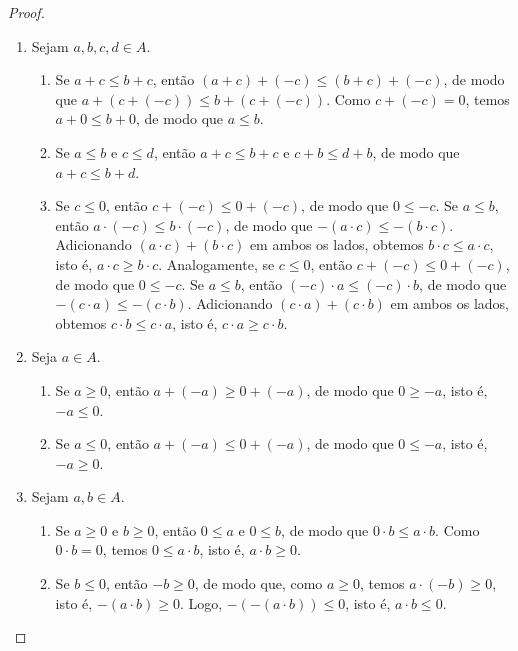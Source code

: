 \begin{proof}
    \leavevmode
        \begin{enumerate}[leftmargin=*, align=left, label=\textbf{(\alph*)}]
            \item Sejam $a, b, c, d \in A$.
                \begin{enumerate}[label=\roman*.]
                    \item Se $a+c \leq b+c$, então $(a+c)+(-c) \leq (b+c)+(-c)$, de modo que $a+(c+(-c)) \leq b+(c+(-c))$. Como $c+(-c) = 0$, temos $a+0 \leq b+0$, de modo que $a \leq b$.
                    \item Se $a \leq b$ e $c \leq d$, então $a+c \leq b+c$ e $c+b \leq d+b$, de modo que $a+c \leq b+d$.
                    \item Se $c \leq 0$, então $c+(-c) \leq 0+(-c)$, de modo que $0 \leq -c$. Se $a \leq b$, então $a \cdot (-c) \leq b \cdot (-c)$, de modo que $-(a \cdot c) \leq -(b \cdot c)$. Adicionando $(a \cdot c) + (b \cdot c)$ em ambos os lados, obtemos $b \cdot c \leq a \cdot c$, isto é, $a \cdot c \geq b \cdot c$. Analogamente, se $c \leq 0$, então $c+(-c) \leq 0+(-c)$, de modo que $0 \leq -c$. Se $a \leq b$, então $(-c) \cdot a \leq (-c) \cdot b$, de modo que $-(c \cdot a) \leq -(c \cdot b)$. Adicionando $(c \cdot a) + (c \cdot b)$ em ambos os lados, obtemos $c \cdot b \leq c \cdot a$, isto é, $c \cdot a \geq c \cdot b$.
                \end{enumerate}
            \blackproof
            \item Seja $a \in A$.
                \begin{enumerate}[label=\roman*.]
                    \item Se $a \geq 0$, então $a+(-a) \geq 0+(-a)$, de modo que $0 \geq -a$, isto é, $-a \leq 0$.
                    \item Se $a \leq 0$, então $a+(-a) \leq 0+(-a)$, de modo que $0 \leq -a$, isto é, $-a \geq 0$.
                \end{enumerate}
            \blackproof
            \item Sejam $a, b \in A$.
                \begin{enumerate}[label=\roman*.]
                    \item Se $a \geq 0$ e $b \geq 0$, então $0 \leq a$ e $0 \leq b$, de modo que $0 \cdot b \leq a \cdot b$. Como $0 \cdot b = 0$, temos $0 \leq a \cdot b$, isto é, $a \cdot b \geq 0$.
                    \item Se $b \leq 0$, então $-b \geq 0$, de modo que, como $a \geq 0$, temos $a \cdot (-b) \geq 0$, isto é, $-(a \cdot b) \geq 0$. Logo, $-(-(a \cdot b)) \leq 0$, isto é, $a \cdot b \leq 0$.

\end{enumerate}
\end{enumerate}
\end{proof}
